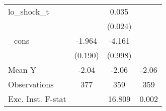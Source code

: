 {\begin{tabular}{l*{3}{c}}
\addlinespace
lo\_shock\_t  &                     &       0.035         &                     \\
            &                     &     (0.024)         &                     \\
\addlinespace
\_cons      &      -1.964\sym{***}&      -4.161\sym{***}&                     \\
            &     (0.190)         &     (0.998)         &                     \\
\midrule
Mean Y      &       -2.04         &       -2.06         &       -2.06         \\
Observations&         377         &         359         &         359         \\
Exc. Inst. F-stat&                     &      16.809         &       0.002         \\
\bottomrule
\end{tabular}
}
